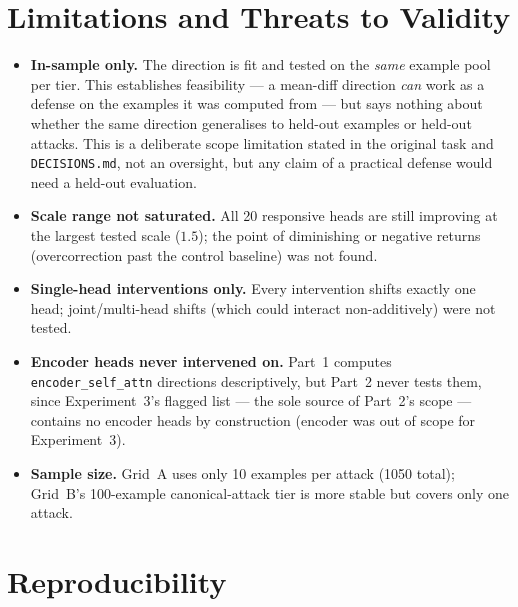 \documentclass[11pt]{article}
\begin{document}
\section{Limitations and Threats to Validity}
\label{sec:limits}

\begin{itemize}
  \item \textbf{In-sample only.} The direction is fit and tested on the
        \emph{same} example pool per tier. This establishes feasibility ---
        a mean-diff direction \emph{can} work as a defense on the examples
        it was computed from --- but says nothing about whether the same
        direction generalises to held-out examples or held-out attacks.
        This is a deliberate scope limitation stated in the original task
        and \texttt{DECISIONS.md}, not an oversight, but any claim of a
        practical defense would need a held-out evaluation.
  \item \textbf{Scale range not saturated.} All 20 responsive heads are
        still improving at the largest tested scale ($1.5$); the point of
        diminishing or negative returns (overcorrection past the control
        baseline) was not found.
  \item \textbf{Single-head interventions only.} Every intervention shifts
        exactly one head; joint/multi-head shifts (which could interact
        non-additively) were not tested.
  \item \textbf{Encoder heads never intervened on.} Part~1 computes
        \texttt{encoder\_self\_attn} directions descriptively, but Part~2
        never tests them, since Experiment~3's flagged list --- the sole
        source of Part~2's scope --- contains no encoder heads by
        construction (encoder was out of scope for Experiment~3).
  \item \textbf{Sample size.} Grid~A uses only 10 examples per attack (1050
        total); Grid~B's 100-example canonical-attack tier is more stable
        but covers only one attack.
\end{itemize}

\section{Reproducibility}
\end{document}
